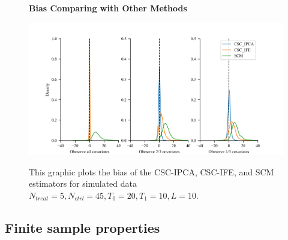 \documentclass[12pt]{article}
\begin{document}
\begin{figure}[!ht]
\centering
\caption{\textbf{Bias Comparing with Other Methods}}
\includegraphics{figs/bias_compar1.png}
\label{fig: bias}
\caption*{\footnotesize{This graphic plots the bias of the CSC-IPCA, CSC-IFE, and SCM estimators for simulated data $N_{treat} = 5, N_{ctrl} = 45, T_0=20, T_1=10, L=10$.}}
\end{figure}

\subsection{Finite sample properties}
\end{document}
